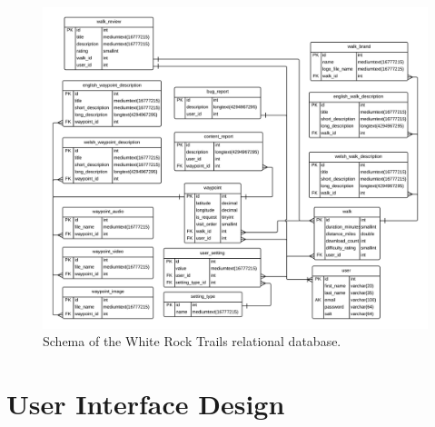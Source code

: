 \documentclass[11pt,a4paper]{article}
\begin{document}
\begin{figure}[H]
\centering
\includegraphics[angle=90, width=1\linewidth]{./img/DatabaseSchema}
\caption{Schema of the White Rock Trails relational database.}
\label{fig:DatabaseSchema}
\end{figure}


\section{User Interface Design}
\end{document}
